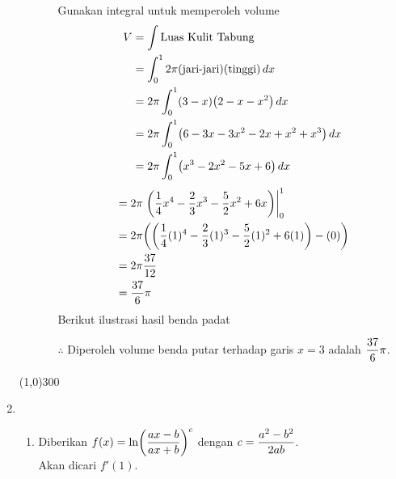 \begin{enumerate}[leftmargin=*, label={\arabic*}.]
\begin{enumerate}[label={\alph*}.]
\begin{enumerate}[label={\roman*}.]
        Gunakan integral untuk memperoleh volume
        \begin{align*}
            V &= \int \text{Luas Kulit Tabung}\\
            &=\int_{0}^{1} 2\pi(\text{jari-jari})(\text{tinggi})\,dx\\
            &=2\pi\int_{0}^{1} (3-x)\brk*{2-x-x^{2}}\,dx\\
            &=2\pi\int_{0}^{1} \brk*{6-3x-3x^{2}-2x+x^{2}+x^{3}}\,dx\\
            &=2\pi\int_{0}^{1} \brk*{x^{3}-2x^{2}-5x+6}\,dx
        \end{align*}
        \begin{align*}
            &=2\pi\eval{\frac{1}{4}x^{4}-\frac{2}{3}x^{3}-\frac{5}{2}x^{2}+6x}{0}{1}\\
            &=2\pi\brk*{\brk*{\frac{1}{4}(1)^{4}-\frac{2}{3}(1)^{3}
            -\frac{5}{2}(1)^{2}+6(1)}-(0)}\\
            &=2\pi\frac{37}{12}\\
            &=\frac{37}{6}\pi
        \end{align*}
        Berikut ilustrasi hasil benda padat

        
        $\therefore$ Diperoleh volume benda putar terhadap garis 
        $x=3$ adalah $\displaystyle\frac{37}{6}\pi$.

        \end{enumerate}
    \end{enumerate}

\begin{center}\line(1,0){300}\end{center}


\item 
    \begin{enumerate}[label={\alph*}.]
    \item Diberikan $\ds f(x) = \ln\brk*{\frac{ax-b}{ax+b}}^{c}$ dengan 
    $\displaystyle c=\frac{a^{2}-b^{2}}{2ab}$.\\
    Akan dicari $f'(1)$.


\end{enumerate}
\end{enumerate}
